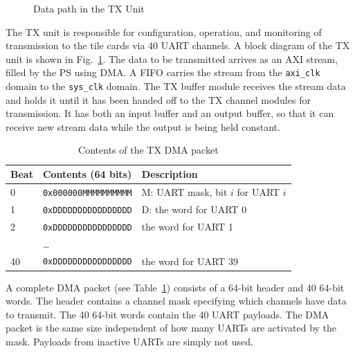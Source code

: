 \documentclass[12pt]{article}
\begin{document}
\begin{figure}[htbp]
\caption{Data path in the TX Unit}
\label{fig:tx-unit}
\end{figure}


\noindent
The TX unit is responsible for configuration, operation, and
monitoring of transmission to the tile cards via 40 UART channels.  A
block diagram of the TX unit is shown in Fig.~\ref{fig:tx-unit}.  The
data to be transmitted arrives as an AXI stream, filled by the PS
using DMA. A FIFO carries the stream from the {\tt axi\_clk} domain to
the {\tt sys\_clk} domain.  The TX buffer module receives the stream
data and holds it until it has been handed off to the TX channel
modules for transmission.  It has both an input buffer and an output
buffer, so that it can receive new stream data while the output is
being held constant.

\begin{table}[htbp]
\caption{Contents of the TX DMA packet}
\label{tbl:tx-dma}
\begin{center}
\begin{tabular}{lll}
Beat & Contents (64 bits)                    & Description \\
\hline
0    & \texttt{0x000000MMMMMMMMMM}           & M: UART mask, bit $i$ for UART $i$ \\
1    & \texttt{0xDDDDDDDDDDDDDDDD}           & D: the word for UART 0 \\
2    & \texttt{0xDDDDDDDDDDDDDDDD}           & the word for UART 1 \\
     & \ldots                                & \\
40   & \texttt{0xDDDDDDDDDDDDDDDD}           & the word for UART 39 \\
\end{tabular}
\end{center}
\end{table}

A complete DMA packet (see Table~\ref{tbl:tx-dma}) consists of a
64-bit header and 40 64-bit words.  The header contains a channel mask
specifying which channels have data to transmit.  The 40 64-bit words
contain the 40 UART payloads.  The DMA packet is the same size
independent of how many UARTs are activated by the mask.  Payloads
from inactive UARTs are simply not used.
\end{document}
